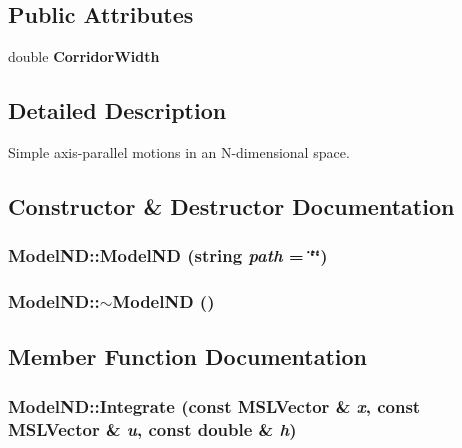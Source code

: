 \subsection*{Public Attributes}
\begin{CompactItemize}
\item 
double {\bf Corridor\-Width}
\end{CompactItemize}


\subsection{Detailed Description}
Simple axis-parallel motions in an N-dimensional space.



\subsection{Constructor \& Destructor Documentation}
\subsubsection{\setlength{\rightskip}{0pt plus 5cm}Model\-ND::Model\-ND (string {\em path} = \char`\"{}\char`\"{})}\label{classModelND_a0}


\subsubsection{\setlength{\rightskip}{0pt plus 5cm}Model\-ND::$\sim$Model\-ND ()\hspace{0.3cm}{\tt  [inline, virtual]}}\label{classModelND_a1}




\subsection{Member Function Documentation}
\subsubsection{ Model\-ND::Integrate (const {\bf MSLVector} \& {\em x}, const {\bf MSLVector} \& {\em u}, const double \& {\em h})\hspace{0.3cm}{\tt  [virtual]}}\label{classModelND_a3}


